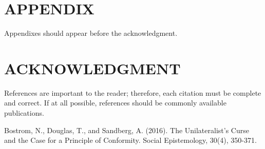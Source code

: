 \documentclass[letterpaper, 10 pt, conference]{ieeeconf}  %
\begin{document}
\addtolength{\textheight}{-12cm}   %







\section*{APPENDIX}

Appendixes should appear before the acknowledgment.

\section*{ACKNOWLEDGMENT}


References are important to the reader; therefore, each citation must be complete and correct. If at all possible, references should be commonly available publications.



\begin{thebibliography}{99}

 Bostrom, N., Douglas, T., and Sandberg, A. (2016). The Unilateralist’s Curse and the Case for a Principle of Conformity. Social Epistemology, 30(4), 350-371.

\end{thebibliography}
\end{document}
